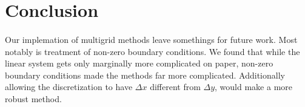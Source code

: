 \documentclass[pdftex,12pt,a4paper]{article}
\begin{document}
\newpage
\section{Conclusion}
    
    \paragraph*{} Our implemation of multigrid methods leave somethings for future work. Most notably is treatment of non-zero boundary conditions. We found that while the linear system gets only marginally more complicated on paper, non-zero boundary conditions made the methods far more complicated. Additionally allowing the discretization to have $\Delta x$ different from $\Delta y$, would make a more robust method.

\newpage

 

\end{document}
